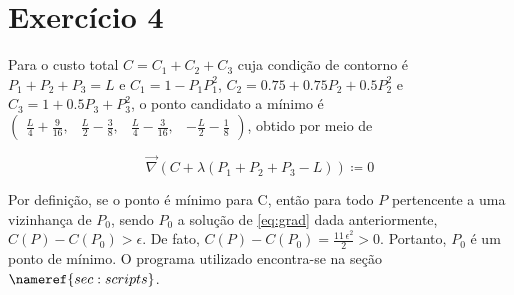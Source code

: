 \section{Exercício 4}

Para o custo total $C = C_1 + C_2 + C_3$ cuja condição de contorno é $P_1 + P_2 + P_3 = L$ e $C_1 = 1 - P_1  P_1^2$, $C_2 = 0.75 + 0.75 P_2 + 0.5 P_2^2$ e $C_3 = 1 + 0.5 P_3 + P_3^2$, o ponto candidato a mínimo é $
\left(\begin{array}{cccc} \frac{L}{4} + \frac{9}{16}, & \frac{L}{2} - \frac{3}{8}, & \frac{L}{4} - \frac{3}{16}, &  - \frac{L}{2} - \frac{1}{8} \end{array}\right)$, obtido por meio de 

\begin{equation}
\label{eq:grad}
\vec \nabla (C + \lambda (P_1 + P_2 + P_3 - L)) \coloneqq 0
\end{equation}

Por definição, se o ponto é mínimo para C, então para todo $P$ pertencente a uma vizinhança de $P_0$, sendo $P_0$ a solução de \eqref{eq:grad} dada anteriormente, $C(P) - C(P_0) > \epsilon$. De fato, $C(P) - C(P_0) = \frac{11\, {\epsilon}^2}{2} > 0$. Portanto, $P_0$ é um ponto de mínimo. O programa utilizado encontra-se na seção $\nameref{sec:scripts}$.